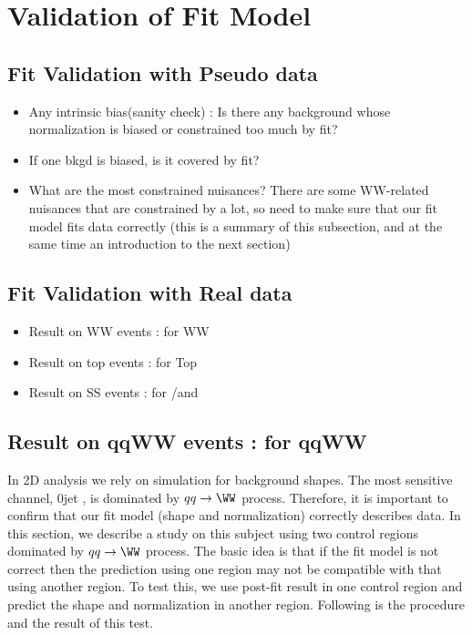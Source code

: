 
\section{Validation of Fit Model} 
\subsection{Fit Validation with Pseudo data} 
\begin{itemize} 
\item Any intrinsic bias(sanity check) : Is there any background 
      whose normalization is biased or constrained too much by fit?
\item If one bkgd is biased, is it covered by fit? 
\item What are the most constrained nuisances?  There are some WW-related nuisances   
that are constrained by a lot, so need to make sure that our fit model fits data correctly 
(this is a summary of this subsection, and at the same time an introduction to the next section)
\end{itemize} 

\subsection{Fit Validation with Real data}
\begin{itemize} 
\item Result on WW events : for WW 
\item Result on top events : for Top 
\item Result on SS events : for \wgamma/\wgammastar and \Wjets
\end{itemize} 

\subsection{Result on qqWW events : for qqWW}  

In 2D analysis we rely on simulation for background shapes. 
The most sensitive channel, 0jet \DF, is dominated by $qq\rightarrow\WW$ process. 
Therefore, it is important to confirm that our fit model (shape and normalization) 
correctly describes data. In this section, we describe a study on this subject using two 
control regions dominated by $qq\rightarrow\WW$ process.
The basic idea is that if the fit model is not correct then the prediction using 
one region may not be compatible with that using another region. To test this, 
we use post-fit result in one control region and predict the shape and normalization 
in another region. Following is the procedure and the result of this test. 

